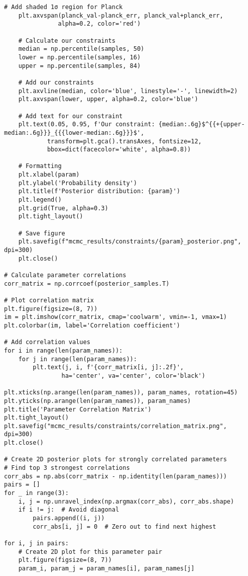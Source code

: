 \documentclass[11pt]{article}
\begin{document}
\begin{enumerate}
\begin{lstlisting}[basicstyle=\small\ttfamily]
    # Add shaded 1σ region for Planck
    plt.axvspan(planck_val-planck_err, planck_val+planck_err, 
               alpha=0.2, color='red')
    
    # Calculate our constraints
    median = np.percentile(samples, 50)
    lower = np.percentile(samples, 16)
    upper = np.percentile(samples, 84)
    
    # Add our constraints
    plt.axvline(median, color='blue', linestyle='-', linewidth=2)
    plt.axvspan(lower, upper, alpha=0.2, color='blue')
    
    # Add text for our constraint
    plt.text(0.05, 0.95, f'Our constraint: {median:.6g}$^{{+{upper-median:.6g}}}_{{{lower-median:.6g}}}$',
            transform=plt.gca().transAxes, fontsize=12,
            bbox=dict(facecolor='white', alpha=0.8))
    
    # Formatting
    plt.xlabel(param)
    plt.ylabel('Probability density')
    plt.title(f'Posterior distribution: {param}')
    plt.legend()
    plt.grid(True, alpha=0.3)
    plt.tight_layout()
    
    # Save figure
    plt.savefig(f"mcmc_results/constraints/{param}_posterior.png", dpi=300)
    plt.close()

# Calculate parameter correlations
corr_matrix = np.corrcoef(posterior_samples.T)

# Plot correlation matrix
plt.figure(figsize=(8, 7))
im = plt.imshow(corr_matrix, cmap='coolwarm', vmin=-1, vmax=1)
plt.colorbar(im, label='Correlation coefficient')

# Add correlation values
for i in range(len(param_names)):
    for j in range(len(param_names)):
        plt.text(j, i, f'{corr_matrix[i, j]:.2f}', 
                ha='center', va='center', color='black')

plt.xticks(np.arange(len(param_names)), param_names, rotation=45)
plt.yticks(np.arange(len(param_names)), param_names)
plt.title('Parameter Correlation Matrix')
plt.tight_layout()
plt.savefig("mcmc_results/constraints/correlation_matrix.png", dpi=300)
plt.close()

# Create 2D posterior plots for strongly correlated parameters
# Find top 3 strongest correlations
corr_abs = np.abs(corr_matrix - np.identity(len(param_names)))
pairs = []
for _ in range(3):
    i, j = np.unravel_index(np.argmax(corr_abs), corr_abs.shape)
    if i != j:  # Avoid diagonal
        pairs.append((i, j))
        corr_abs[i, j] = 0  # Zero out to find next highest
        
for i, j in pairs:
    # Create 2D plot for this parameter pair
    plt.figure(figsize=(8, 7))
    param_i, param_j = param_names[i], param_names[j]
    

\end{lstlisting}
\end{enumerate}
\end{document}
